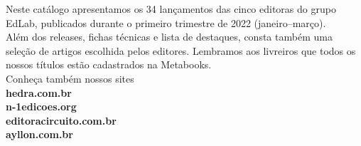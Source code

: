 \hspace*{-.5cm}\parbox{180pt}{\raggedright 
Neste catálogo apresentamos os 34 lançamentos das cinco editoras do grupo EdLab, publicados durante o primeiro trimestre de 2022 (janeiro--março).\\
\smallskip
Além dos releases, fichas técnicas e lista de destaques, consta também uma seleção de artigos escolhida pelos editores. Lembramos aos livreiros que todos os nossos títulos estão cadastrados na Metabooks.\\
\bigskip
Conheça também nossos sites\\
\textbf{hedra.com.br}\\
\textbf{n-1edicoes.org}\\
\textbf{editoracircuito.com.br}\\
\textbf{ayllon.com.br}
}

\pagebreak



